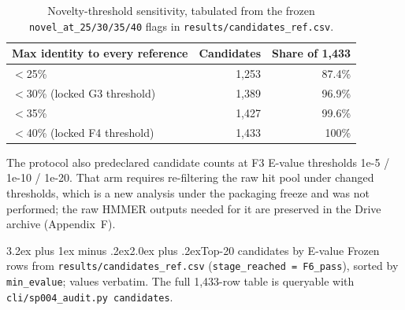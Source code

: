 \documentclass[11pt]{article}
\makeatletter
\renewcommand{\section}{\@startsection{section}{1}{\z@}%
  {3.2ex plus 1ex minus .2ex}{2.0ex plus .2ex}{\Large\bfseries\color{navy}}}
\makeatother
\begin{document}
\begin{table}[h]
\centering\small
{}
\begin{tabular}{|l|r|r|}
\hline
\rowcolor{lightnavy}\textbf{Max identity to every reference} & \textbf{Candidates} & \textbf{Share of 1,433} \\\hline
$<$25\% & 1,253 & 87.4\% \\\hline
$<$30\% (locked G3 threshold) & 1,389 & 96.9\% \\\hline
$<$35\% & 1,427 & 99.6\% \\\hline
$<$40\% (locked F4 threshold) & 1,433 & 100\% \\\hline
\end{tabular}
\caption{Novelty-threshold sensitivity, tabulated from the frozen \texttt{novel\_at\_25/30/35/40} flags in \texttt{results/candidates\_ref.csv}.}
\end{table}

The protocol also predeclared candidate counts at F3 E-value thresholds 1e-5 / 1e-10 / 1e-20. That arm requires re-filtering the raw hit pool under changed thresholds, which is a new analysis under the packaging freeze and was not performed; the raw HMMER outputs needed for it are preserved in the Drive archive (Appendix~F).

\section{Top-20 candidates by E-value}
Frozen rows from \texttt{results/candidates\_ref.csv} (\texttt{stage\_reached = F6\_pass}), sorted by \texttt{min\_evalue}; values verbatim. The full 1,433-row table is queryable with \texttt{cli/sp004\_audit.py candidates}.
\end{document}
